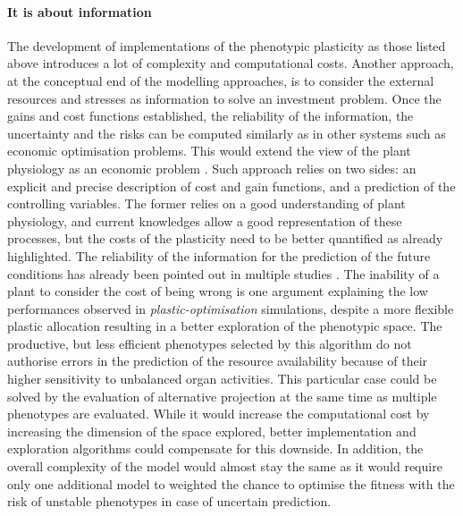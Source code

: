 
%
%

\paragraph{It is about information}

The development of implementations of the phenotypic plasticity as those listed above introduces a lot of complexity and computational costs. Another approach, at the conceptual end of the modelling approaches, is to consider the external resources and stresses as information to solve an investment problem. Once the gains and cost functions established, the reliability of the information, the uncertainty and the risks can be computed similarly as in other systems such as economic optimisation problems. This would extend the view of the plant physiology as an economic problem \parencite{westoby_time_2000, wright_worldwide_2004, mcmurtrie_leaf-trait_2011}. Such approach relies on two sides: an explicit and precise description of cost and gain functions, and a prediction of the controlling variables. The former relies on a good understanding of plant physiology, and current knowledges allow a good representation of these processes, but the costs of the plasticity need to be better quantified as already highlighted. The reliability of the information for the prediction of the future conditions has already been pointed out in multiple studies \parencite{ dewitt_costs_1998, auld_re-evaluating_2009, richter_phenotypic_2012}. The inability of a plant to consider the cost of being wrong is one argument explaining the low performances observed in \textit{plastic-optimisation} simulations, despite a more flexible plastic allocation resulting in a better exploration of the phenotypic space. The productive, but less efficient phenotypes selected by this algorithm do not authorise errors in the prediction of the resource availability because of their higher sensitivity to unbalanced organ activities. This particular case could be solved by the evaluation of alternative projection at the same time as multiple phenotypes are evaluated. While it would increase the computational cost by increasing the dimension of the space explored, better implementation and exploration algorithms could compensate for this downside. In addition, the overall complexity of the model would almost stay the same as it would require only one additional model to weighted the chance to optimise the fitness with the risk of unstable phenotypes in case of uncertain prediction.

